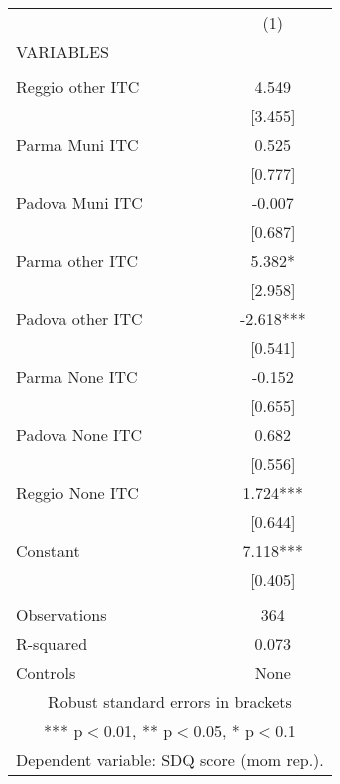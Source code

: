 \begin{tabular}{lc} \hline
 & (1) \\
VARIABLES &  \\ \hline
 &  \\
Reggio other ITC & 4.549 \\
 & [3.455] \\
Parma Muni ITC & 0.525 \\
 & [0.777] \\
Padova Muni ITC & -0.007 \\
 & [0.687] \\
Parma other ITC & 5.382* \\
 & [2.958] \\
Padova other ITC & -2.618*** \\
 & [0.541] \\
Parma None ITC & -0.152 \\
 & [0.655] \\
Padova None ITC & 0.682 \\
 & [0.556] \\
Reggio None ITC & 1.724*** \\
 & [0.644] \\
Constant & 7.118*** \\
 & [0.405] \\
 &  \\
Observations & 364 \\
R-squared & 0.073 \\
 Controls & None \\ \hline
\multicolumn{2}{c}{ Robust standard errors in brackets} \\
\multicolumn{2}{c}{ *** p$<$0.01, ** p$<$0.05, * p$<$0.1} \\
\multicolumn{2}{c}{ Dependent variable: SDQ score (mom rep.).} \\
\end{tabular}
